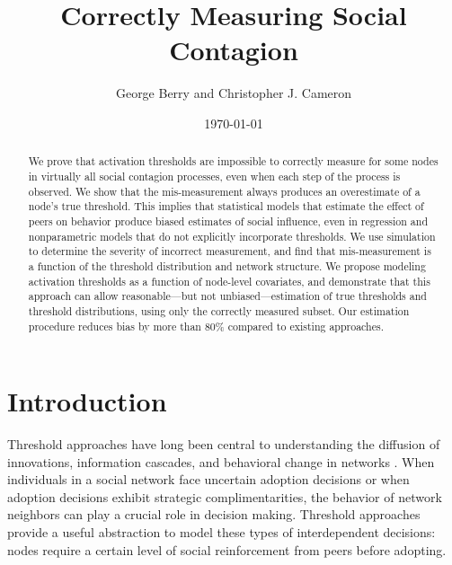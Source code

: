 \documentclass[a4paper]{article}
\title{Correctly Measuring Social Contagion}
\author{George Berry and Christopher J. Cameron}
\date{\today}
\begin{document}
\maketitle

\begin{abstract}
We prove that activation thresholds are impossible to correctly measure for some nodes in virtually all social contagion processes, even when each step of the process is observed. We show that the mis-measurement always produces an overestimate of a node's true threshold. This implies that statistical models that estimate the effect of peers on behavior produce biased estimates of social influence, even in regression and nonparametric models that do not explicitly incorporate thresholds. We use simulation to determine the severity of incorrect measurement, and find that mis-measurement is a function of the threshold distribution and network structure. We propose modeling activation thresholds as a function of node-level covariates, and demonstrate that this approach can allow reasonable---but not unbiased---estimation of true thresholds and threshold distributions, using only the correctly measured subset. Our estimation procedure reduces bias by more than 80\% compared to existing approaches.
\end{abstract}

\section{Introduction}

\begin{comment}
TODO:
1. make clearer distinction between states-of-world and the parts the researcher observes
2. proof read
3. graph of error in non-threshold regression model
4. prediction at k correct baseline
\end{comment}

Threshold approaches have long been central to understanding the diffusion of innovations, information cascades, and behavioral change in networks \parencite{Rogers1962, Granovetter1978, Valente1996, Kempe2003, Macy1990, Watts2002}. When individuals in a social network face uncertain adoption decisions or when adoption decisions exhibit strategic complimentarities, the behavior of network neighbors can play a crucial role in decision making. Threshold approaches provide a useful abstraction to model these types of interdependent decisions: nodes require a certain level of social reinforcement from peers before adopting.
\end{document}
